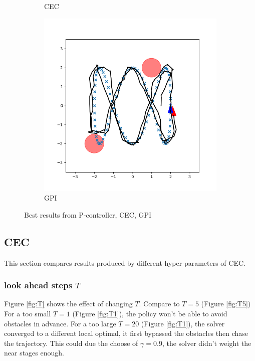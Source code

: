 \documentclass[conference]{IEEEtran}
\begin{document}
\begin{figure}
\begin{subfigure}[b]{0.3\textwidth}
        \caption{CEC}
        \label{fig:cec}
    \end{subfigure}
    \hfill
    \begin{subfigure}[b]{0.3\textwidth}
        \includegraphics[width=\textwidth]{../fig/trajectory.gpi.png}
        \caption{GPI}
        \label{fig:gpi}
    \end{subfigure}
    \caption{Best results from P-controller, CEC, GPI}
    \label{fig:best}
\end{figure}

\subsection{CEC}
This section compares results produced by different hyper-parameters of CEC.

\subsubsection{look ahead steps $T$}
Figure \ref{fig:T} shows the effect of changing $T$.
Compare to $T=5$ (Figure \ref{fig:T5})
For a too small $T=1$ (Figure \ref{fig:T1}), the policy won't be able to avoid obstacles in advance.
For a too large $T=20$ (Figure \ref{fig:T1}), the solver converged to a different local optimal, 
it first bypassed the obstacles then chase the trajectory. 
This could due the choose of $\gamma = 0.9$, 
the solver didn't weight the near stages enough.
\end{document}
